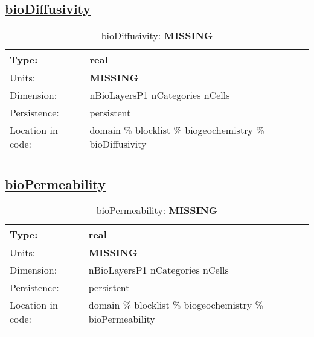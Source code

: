 \subsection[bioDiffusivity]{\hyperref[sec:var_tab_biogeochemistry]{bioDiffusivity}}
\label{subsec:var_sec_biogeochemistry_bioDiffusivity}
\begin{center}
\begin{longtable}{| p{2.0in} | p{4.0in} |}
        \hline 
        Type: & real \\
        \hline 
        Units: & {\bf \color{red} MISSING} \\
        \hline 
        Dimension: & nBioLayersP1 nCategories nCells \\
        \hline 
        Persistence: & persistent \\
        \hline 
         Location in code: & domain \% blocklist \% biogeochemistry \% bioDiffusivity \\
         \hline 
    \caption{bioDiffusivity: {\bf \color{red} MISSING}}
\end{longtable}
\end{center}
\subsection[bioPermeability]{\hyperref[sec:var_tab_biogeochemistry]{bioPermeability}}
\label{subsec:var_sec_biogeochemistry_bioPermeability}
\begin{center}
\begin{longtable}{| p{2.0in} | p{4.0in} |}
        \hline 
        Type: & real \\
        \hline 
        Units: & {\bf \color{red} MISSING} \\
        \hline 
        Dimension: & nBioLayersP1 nCategories nCells \\
        \hline 
        Persistence: & persistent \\
        \hline 
         Location in code: & domain \% blocklist \% biogeochemistry \% bioPermeability \\
         \hline 
    \caption{bioPermeability: {\bf \color{red} MISSING}}
\end{longtable}
\end{center}
